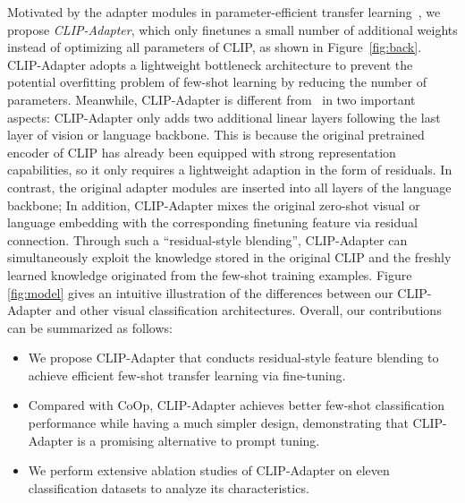 \documentclass[default,iicol]{sn-jnl}%
\theoremstyle{thmstyleone}%
\theoremstyle{thmstyletwo}%
\theoremstyle{thmstylethree}%
\begin{document}
Motivated by the adapter modules in parameter-efficient transfer learning~\cite{houlsby2019parameter}, we propose \emph{CLIP-Adapter}, which only finetunes a small number of additional weights instead of optimizing all parameters of CLIP, as shown in Figure~\ref{fig:back}. CLIP-Adapter adopts a lightweight bottleneck architecture to prevent the potential overfitting problem of few-shot learning by reducing the number of parameters. Meanwhile, CLIP-Adapter is different from~\cite{houlsby2019parameter} in two important aspects:
CLIP-Adapter only adds two additional linear layers following the last layer of vision or language backbone. This is because the original pretrained encoder of CLIP has already been equipped with strong representation capabilities, so it only requires a lightweight adaption in the form of residuals. In contrast, the original adapter modules are inserted into all layers of the language backbone; In addition, CLIP-Adapter mixes the original zero-shot visual or language embedding with the corresponding finetuning feature via residual connection. Through such a ``residual-style blending'', CLIP-Adapter can simultaneously exploit the knowledge stored in the original CLIP and the freshly learned knowledge originated from the few-shot training examples. Figure \ref{fig:model} gives an intuitive illustration of the differences between our CLIP-Adapter and other visual classification architectures. Overall, our contributions can be summarized as follows:
\begin{itemize}[leftmargin=*,noitemsep]
    \item We propose CLIP-Adapter that conducts residual-style feature blending to achieve efficient few-shot transfer learning via fine-tuning. 
    \item Compared with CoOp, CLIP-Adapter achieves better few-shot classification performance while having a much simpler design, demonstrating that CLIP-Adapter is a promising alternative to prompt tuning.
    \item We perform extensive ablation studies of CLIP-Adapter on eleven classification datasets to analyze its characteristics.
\end{itemize}
\end{document}
